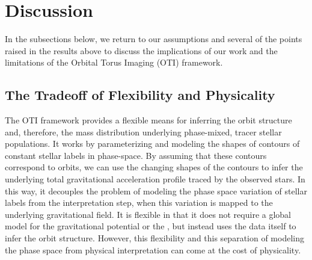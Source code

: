 

\section{Discussion} \label{sec:discussion}

In the subsections below, we return to our assumptions and several of the points raised
in the results above to discuss the implications of our work and the limitations of the
Orbital Torus Imaging (OTI) framework.

\subsection{The Tradeoff of Flexibility and Physicality} \label{sec:disc-tradeoff}

The OTI framework provides a flexible means for inferring the orbit structure and,
therefore, the mass distribution underlying phase-mixed, tracer stellar populations.
It works by parameterizing and modeling the shapes of contours of constant stellar
labels in phase-space.
By assuming that these contours correspond to orbits, we can use the changing shapes of
the contours to infer the underlying total gravitational acceleration profile traced by
the observed stars.
In this way, it decouples the problem of modeling the phase space variation of stellar
labels from the interpretation step, when this variation is mapped to the underlying
gravitational field.
It is flexible in that it does not require a global model for the gravitational
potential or the \df, but instead uses the data itself to infer the orbit structure.
However, this flexibility and this separation of modeling the phase space from physical
interpretation can come at the cost of physicality.

